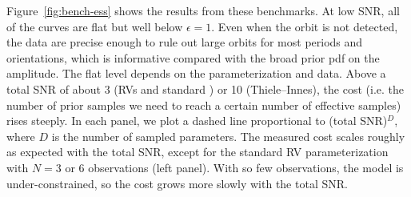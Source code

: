 \documentclass[twocolumn]{AASTeX7/aastex701}
\begin{document}
Figure~\ref{fig:bench-ess} shows the results from these benchmarks.
At low SNR, all of the curves are flat but well below $\epsilon = 1$.
Even when the orbit is not detected, the data are precise enough to rule out large
orbits for most periods and orientations, which is informative compared with the broad
prior pdf on the amplitude.
The flat level depends on the parameterization and data.
Above a total SNR of about 3 (RVs and standard \gaia) or 10 (Thiele--Innes), the cost
(i.e. the number of prior samples we need to reach a certain number of effective
samples) rises steeply.
In each panel, we plot a dashed line proportional to (total SNR)$^D$, where $D$ is the
number of sampled parameters.
The measured cost scales roughly as expected with the total SNR, except for the standard
RV parameterization with $N=3$ or 6 observations (left panel).
With so few observations, the model is under-constrained, so the cost grows more slowly
with the total SNR.

\end{document}
